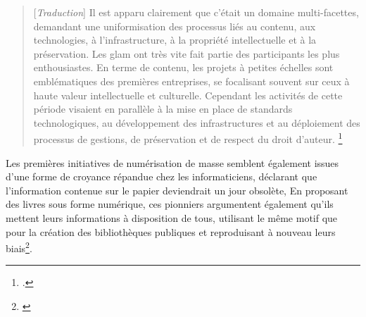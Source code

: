 \begin{quotation}
[\textit{Traduction}]
Il est apparu clairement que c'était un domaine multi-facettes, demandant une uniformisation des processus liés au contenu, aux technologies, à l'infrastructure, à la propriété intellectuelle et à la préservation. Les \gls{glam} ont très vite fait partie des participants les plus enthousiastes. En terme de contenu, les projets à petites échelles sont emblématiques des premières entreprises, se focalisant souvent sur ceux à haute valeur intellectuelle et culturelle. Cependant les activités de cette période visaient en parallèle à la mise en place de standards technologiques, au développement des infrastructures et au déploiement des processus de gestions, de préservation et de respect du droit d'auteur.
\footnote{\cite[p.12]{coutts_stepping_2017}.}
\end{quotation}

Les premières initiatives de numérisation de masse semblent également issues d'une forme de croyance répandue chez les informaticiens, déclarant que l'information contenue sur le papier deviendrait un jour obsolète,  En proposant des livres sous forme numérique, ces pionniers argumentent également qu'ils mettent leurs informations à disposition de tous, utilisant le même motif que pour la création des bibliothèques publiques et reproduisant à nouveau leurs biais\footnote{\cite[p.8]{thylstrup_politics_2018}}.

